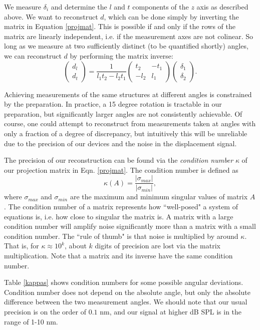 \documentclass[aip,cp,amsmath,amssymb,reprint]{revtex4-2}
\begin{document}
\par{We measure $\delta_i$ and determine the $l$ and $t$ components of the $z$ axis as described above. We want to reconstruct $d$, which can be done simply by inverting the matrix in Equation \ref{projmat}. This is possible if and only if the rows of the matrix are linearly independent, i.e. if the measurement axes are not colinear. So long as we measure at two sufficiently distinct (to be quantified shortly) angles, we can reconstruct $d$ by performing the matrix inverse:
     \begin{equation}\label{fullreconstruct}
         \begin{pmatrix}d_l\\d_t\end{pmatrix}=\frac{1}{l_1 t_2 - l_2 t_1}\begin{pmatrix}t_2&-t_1\\-l_2  & l_1\end{pmatrix}\begin{pmatrix}\delta_1\\ \delta_2\end{pmatrix}.
     \end{equation}
}
\par{Achieving measurements of the same structures at different angles is constrained by the preparation. In practice, a 15 degree rotation is tractable in our preparation, but significantly larger angles are not consistently achievable. Of course, one could attempt to reconstruct from measurements taken at angles with only a fraction of a degree of discrepancy, but intuitively this will be unreliable due to the precision of our devices and the noise in the displacement signal.}
\par{The precision of our reconstruction can be found via the \textit{condition number} $\kappa$ of our projection matrix in Eqn. \ref{projmat}. The condition number is defined as
     \begin{equation}
         \kappa (A) = \frac{|\sigma_{max}|}{|\sigma_{min}|},
     \end{equation}
where $\sigma_{max}$ and $\sigma_{min}$ are the maximum and minimum singular values of matrix $A$. The condition number of a matrix represents how ``well-posed" a system of equations is, i.e. how close to singular the matrix is. A matrix with a large condition number will amplify noise significantly more than a matrix with a small condition number. The ``rule of thumb" is that noise is multiplied by around $\kappa$. That is, for $\kappa \approx 10^k$, about $k$ digits of precision are lost via the matrix multiplication. Note that a matrix and its inverse have the same condition number.
}
\par{Table \ref{kappas} shows condition numbers for some possible angular deviations. Condition number does not depend on the absolute angle, but only the absolute difference between the two measurement angles. We should note that our usual precision is on the order of $0.1$ nm, and our signal at higher dB SPL is in the range of 1-10 nm.}
 
\end{document}
